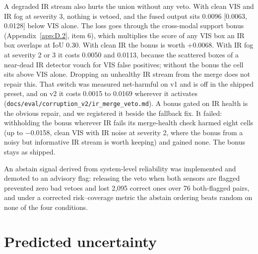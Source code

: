 \documentclass[10pt]{article}
\begin{document}
A degraded IR stream also hurts the union without any veto. With clean VIS and IR fog at severity 3, nothing is vetoed, and the fused output sits 0.0096 [0.0063, 0.0128] below VIS alone. The loss goes through the cross-modal support bonus (Appendix~\ref{app:D.2}, item 6), which multiplies the score of any VIS box an IR box overlaps at IoU 0.30. With clean IR the bonus is worth +0.0068. With IR fog at severity 2 or 3 it costs 0.0050 and 0.0113, because the scattered boxes of a near-dead IR detector vouch for VIS false positives; without the bonus the cell sits above VIS alone. Dropping an unhealthy IR stream from the merge does not repair this. That switch was measured net-harmful on v1 and is off in the shipped preset, and on v2 it costs 0.0015 to 0.0169 wherever it activates (\texttt{docs/\allowbreak{}eval/\allowbreak{}corruption\_\allowbreak{}v2/\allowbreak{}ir\_\allowbreak{}merge\_\allowbreak{}veto.md}). A bonus gated on IR health is the obvious repair, and we registered it beside the fallback fix. It failed: withholding the bonus wherever IR fails its merge-health check harmed eight cells (up to $-$0.0158, clean VIS with IR noise at severity 2, where the bonus from a noisy but informative IR stream is worth keeping) and gained none. The bonus stays as shipped.

An abstain signal derived from system-level reliability was implemented and demoted to an advisory flag: releasing the veto when both sensors are flagged prevented zero bad vetoes and lost 2,095 correct ones over 76 both-flagged pairs, and under a corrected risk--coverage metric the abstain ordering beats random on none of the four conditions.

\FloatBarrier
\section{Predicted uncertainty}\label{app:E}
\end{document}
